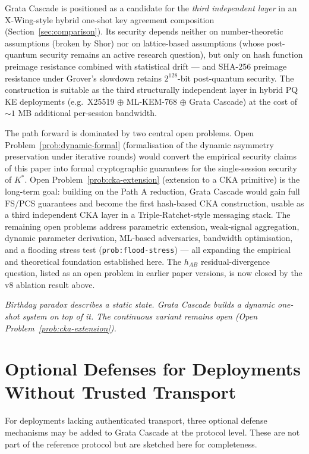 \documentclass[11pt,a4paper]{article}
\begin{document}
Grata Cascade is positioned as a candidate for the \emph{third independent layer} in an X-Wing-style hybrid one-shot key agreement composition (Section~\ref{sec:comparison}). Its security depends neither on number-theoretic assumptions (broken by Shor) nor on lattice-based assumptions (whose post-quantum security remains an active research question), but only on hash function preimage resistance combined with statistical drift --- and SHA-256 preimage resistance under Grover's slowdown retains $2^{128}$-bit post-quantum security. The construction is suitable as the third structurally independent layer in hybrid PQ KE deployments (e.g.\ X25519 $\oplus$ ML-KEM-768 $\oplus$ Grata Cascade) at the cost of $\sim 1$ MB additional per-session bandwidth.

The path forward is dominated by two central open problems. Open Problem~\ref{prob:dynamic-formal} (formalisation of the dynamic asymmetry preservation under iterative rounds) would convert the empirical security claims of this paper into formal cryptographic guarantees for the single-session security of $K^*$. Open Problem~\ref{prob:cka-extension} (extension to a CKA primitive) is the long-term goal: building on the Path A reduction, Grata Cascade would gain full FS/PCS guarantees and become the first hash-based CKA construction, usable as a third independent CKA layer in a Triple-Ratchet-style messaging stack. The remaining open problems address parametric extension, weak-signal aggregation, dynamic parameter derivation, ML-based adversaries, bandwidth optimisation, and a flooding stress test (\texttt{prob:flood-stress}) --- all expanding the empirical and theoretical foundation established here. The $h_{AB}$ residual-divergence question, listed as an open problem in earlier paper versions, is now closed by the v8 ablation result above.

\medskip
\noindent\textit{Birthday paradox describes a static state. Grata Cascade builds a dynamic one-shot system on top of it. The continuous variant remains open (Open Problem~\ref{prob:cka-extension}).}

\appendix

\section{Optional Defenses for Deployments Without Trusted Transport}\label{app:optional-defenses}

For deployments lacking authenticated transport, three optional defense mechanisms may be added to Grata Cascade at the protocol level. These are not part of the reference protocol but are sketched here for completeness.
\end{document}
